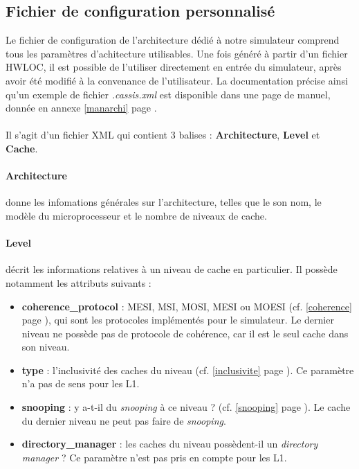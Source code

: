 \subsection{Fichier de configuration personnalisé}
\label{config}
Le fichier de configuration de l'architecture dédié à notre simulateur comprend tous les paramètres d'achitecture utilisables. Une fois généré à partir d'un fichier \textsf{HWLOC}, il est possible de l'utiliser directement en entrée du simulateur, après avoir été modifié à la convenance de l'utilisateur. La documentation précise ainsi qu'un exemple de fichier \textit{.cassis.xml} est disponible dans une page de manuel, donnée en annexe \ref{manarchi} page \pageref{manarchi}.

\paragraph{}
Il s'agit d'un fichier XML qui contient 3 balises : \textbf{Architecture}, \textbf{Level} et \textbf{Cache}.

\paragraph{Architecture} donne les infomations générales sur l'architecture, telles que le son nom, le modèle du microprocesseur et le nombre de niveaux de cache.

\paragraph{Level} décrit les informations relatives à un niveau de cache en particulier. Il possède notamment les attributs suivants :
\begin{itemize}
  \item \textbf{coherence\_protocol} : MESI, MSI, MOSI, MESI ou MOESI (cf. \ref{coherence} page \pageref{coherence}), qui sont les protocoles implémentés pour le simulateur. Le dernier niveau ne possède pas de protocole de cohérence, car il est le seul cache dans son niveau.
  \item \textbf{type} : l'inclusivité des caches du niveau (cf. \ref{inclusivite} page \pageref{inclusivite}). Ce paramètre n'a pas de sens pour les L1.
  \item \textbf{snooping} : y a-t-il du \emph{snooping} à ce niveau ? (cf. \ref{snooping} page \pageref{snooping}). Le cache du dernier niveau ne peut pas faire de \emph{snooping}.
  \item \textbf{directory\_manager} : les caches du niveau possèdent-il un \emph{directory manager} ? Ce paramètre n'est pas pris en compte pour les L1.
\end{itemize}

